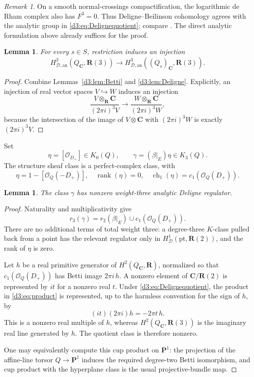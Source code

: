 \documentclass[11pt,a4paper]{amsart}
\numberwithin{equation}{section}
\newtheorem{lemma}[theorem]{Lemma}
\theoremstyle{definition}
\theoremstyle{remark}
\newtheorem{remark}[theorem]{Remark}
\newcommand{\R}{\mathbf R}
\newcommand{\C}{\mathbf C}
\newcommand{\PP}{\mathbf P}
\newcommand{\OO}{\mathcal O}
\newcommand{\HD}{H_{\mathcal D,\mathrm{an}}}
\begin{document}
\begin{remark}
On a smooth normal-crossings compactification, the logarithmic de Rham complex also has $F^3=0$. Thus Deligne--Beilinson cohomology agrees with the analytic group in \eqref{d3:eq:Delignequotient}; compare \cite[Remark~2.13]{EsnaultViehweg}. The direct analytic formulation above already suffices for the proof.
\end{remark}

\begin{lemma}\label{d3:lem:Deligneinject}
For every $s\in S$, restriction induces an injection
\[
\HD^3(Q_{\C},\R(3))\longrightarrow\HD^3((Q_s)_{\C},\R(3)).
\]
\end{lemma}
\begin{proof}
Combine Lemmas~\ref{d3:lem:Betti} and \ref{d3:lem:Deligne}. Explicitly, an injection of real vector spaces $V\hookrightarrow W$ induces an injection
\[
\frac{V\otimes_{\R}\C}{(2\pi i)^3V}
\longrightarrow
\frac{W\otimes_{\R}\C}{(2\pi i)^3W},
\]
because the intersection of the image of $V\otimes\C$ with $(2\pi i)^3W$ is exactly $(2\pi i)^3V$.
\end{proof}

Set
\[
\eta=[\OO_{D_+}]\in K_0(Q),\qquad
\gamma=(\beta|_E)\eta\in K_3(Q).
\]
The structure sheaf class is a perfect-complex class, with
\[
\eta=1-[\OO_Q(-D_+)],\quad \operatorname{rank}(\eta)=0,\quad
\operatorname{ch}_1(\eta)=c_1(\OO_Q(D_+)).
\]

\begin{lemma}\label{d3:lem:product}
The class $\gamma$ has nonzero weight-three analytic Deligne regulator.
\end{lemma}
\begin{proof}
Naturality and multiplicativity give
\begin{equation}\label{d3:eq:product}
r_3(\gamma)=r_2(\beta|_E)\cup c_1(\OO_Q(D_+)).
\end{equation}
There are no additional terms of total weight three: a degree-three $K$-class pulled back from a point has the relevant regulator only in $H^1_{\mathcal D}(\mathrm{pt},\R(2))$, and the rank of $\eta$ is zero.

Let $h$ be a real primitive generator of $H^2(Q_{\C},\R)$, normalized so that $c_1(\OO_Q(D_+))$ has Betti image $2\pi i\,h$. A nonzero element of $\C/\R(2)$ is represented by $it$ for a nonzero real $t$. Under \eqref{d3:eq:Delignequotient}, the product in \eqref{d3:eq:product} is represented, up to the harmless convention for the sign of $h$, by
\[
(it)(2\pi i)h=-2\pi t\,h.
\]
This is a nonzero real multiple of $h$, whereas $H^2(Q_{\C},\R(3))$ is the imaginary real line generated by $h$. The quotient class is therefore nonzero.

One may equivalently compute this cup product on $\PP^1$: the projection of the affine-line torsor $Q\to\PP^1$ induces the required degree-two Betti isomorphism, and cup product with the hyperplane class is the usual projective-bundle map.
\end{proof}
\end{document}
